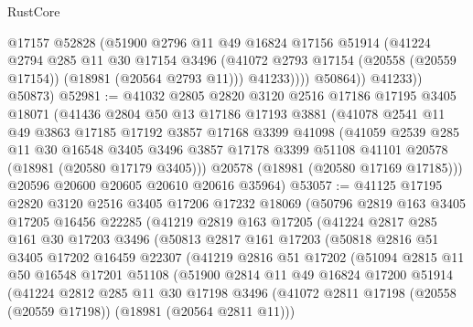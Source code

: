 \begin{lexlean}{RustCore}
\begin{coremodule}
                  @17157
                  @52828
                  (@51900
                    @2796
                    @11
                    @49
                    @16824
                    @17156
                    @51914
                    (@41224
                      @2794
                      @285
                      @11
                      @30
                      @17154
                      @3496
                      (@41072 @2793 @17154 (@20558 (@20559 @17154)) (@18981 (@20564 @2793 @11)))
                      @41233))))
              @50864))
          @41233))
      @50873)
@52981 := @41032
    @2805
    @2820
    @3120
    @2516
    @17186
    @17195
    @3405
    @18071
    (@41436
      @2804
      @50
      @13
      @17186
      @17193
      @3881
      (@41078
        @2541
        @11
        @49
        @3863
        @17185
        @17192
        @3857
        @17168
        @3399
        @41098
        (@41059
          @2539
          @285
          @11
          @30
          @16548
          @3405
          @3496
          @3857
          @17178
          @3399
          @51108
          @41101
          @20578
          (@18981 (@20580 @17179 @3405)))
        @20578
        (@18981 (@20580 @17169 @17185)))
      @20596
      @20600
      @20605
      @20610
      @20616
      @35964)
@53057 := @41125
    @17195
    @2820
    @3120
    @2516
    @3405
    @17206
    @17232
    @18069
    (@50796
      @2819
      @163
      @3405
      @17205
      @16456
      @22285
      (@41219
        @2819
        @163
        @17205
        (@41224
          @2817
          @285
          @161
          @30
          @17203
          @3496
          (@50813
            @2817
            @161
            @17203
            (@50818
              @2816
              @51
              @3405
              @17202
              @16459
              @22307
              (@41219
                @2816
                @51
                @17202
                (@51094
                  @2815
                  @11
                  @50
                  @16548
                  @17201
                  @51108
                  (@51900
                    @2814
                    @11
                    @49
                    @16824
                    @17200
                    @51914
                    (@41224
                      @2812
                      @285
                      @11
                      @30
                      @17198
                      @3496
                      (@41072 @2811 @17198 (@20558 (@20559 @17198)) (@18981 (@20564 @2811 @11)))

\end{coremodule}
\end{lexlean}
